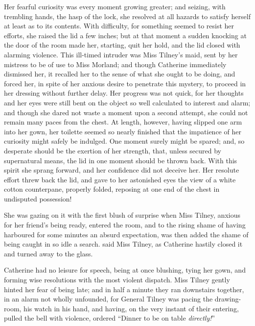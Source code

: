 Her fearful curiosity was every moment growing greater; and seizing, with trembling hands, the hasp of the lock, she resolved at all hazards to satisfy herself at least as to its contents. With difficulty, for something seemed to resist her efforts, she raised the lid a few inches; but at that moment a sudden knocking at the door of the room made her, starting, quit her hold, and the lid closed with alarming violence. This ill-timed intruder was Miss Tilney's maid, sent by her mistress to be of use to Miss Morland; and though Catherine immediately dismissed her, it recalled her to the sense of what she ought to be doing, and forced her, in spite of her anxious desire to penetrate this mystery, to proceed in her dressing without further delay. Her progress was not quick, for her thoughts and her eyes were still bent on the object so well calculated to interest and alarm; and though she dared not waste a moment upon a second attempt, she could not remain many paces from the chest. At length, however, having slipped one arm into her gown, her toilette seemed so nearly finished that the impatience of her curiosity might safely be indulged. One moment surely might be spared; and, so desperate should be the exertion of her strength, that, unless secured by supernatural means, the lid in one moment should be thrown back. With this spirit she sprang forward, and her confidence did not deceive her. Her resolute effort threw back the lid, and gave to her astonished eyes the view of a white cotton counterpane, properly folded, reposing at one end of the chest in undisputed possession!

She was gazing on it with the first blush of surprise when Miss Tilney, anxious for her friend's being ready, entered the room, and to the rising shame of having harboured for some minutes an absurd expectation, was then added the shame of being caught in so idle a search.  said Miss Tilney, as Catherine hastily closed it and turned away to the glass. 

Catherine had no leisure for speech, being at once blushing, tying her gown, and forming wise resolutions with the most violent dispatch. Miss Tilney gently hinted her fear of being late; and in half a minute they ran downstairs together, in an alarm not wholly unfounded, for General Tilney was pacing the drawing-room, his watch in his hand, and having, on the very instant of their entering, pulled the bell with violence, ordered “Dinner to be on table {\em directly!}”

